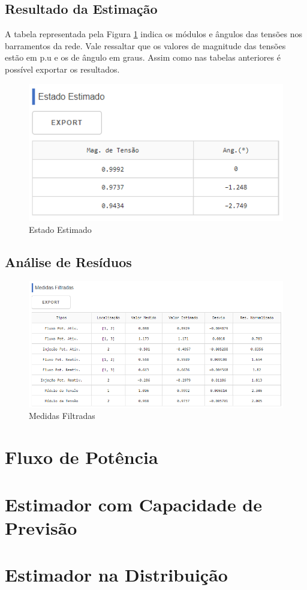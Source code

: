 \documentclass{article}
\begin{document}
\subsection{Resultado da Estimação}
A tabela representada pela Figura \ref{fig:results_SE} indica os módulos e ângulos das tensões nos barramentos da rede. Vale ressaltar que os valores de magnitude das tensões estão em p.u e os de ângulo em graus. Assim como nas tabelas anteriores é possível exportar os resultados.  
\begin{figure}[H]
    \centering
    \includegraphics[scale = .65]{Imagens/Medidas_Estimadas_Ferramenta.PNG}
    \caption{Estado Estimado}
    \label{fig:results_SE}
\end{figure}

\subsection{Análise de Resíduos}

\begin{figure}[H]
    \centering
    \includegraphics[scale = .65]{Imagens/Residuos_Normalizados_Ferramenta.PNG}
    \caption{Medidas Filtradas}
    \label{fig:meds_filters}
\end{figure}

\section{Fluxo de Potência}

\section{Estimador com Capacidade de Previsão}

\section{Estimador na Distribuição}
\end{document}
